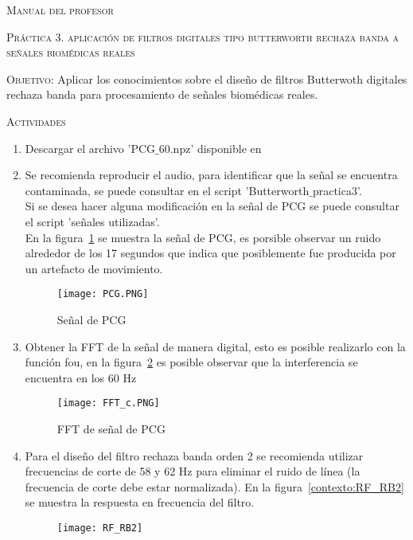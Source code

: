 \documentclass[10pt,letterpaper,spanish,twoside]{report}
\begin{document}
\docdate

\begin{center}
 \textsc{\asignatura}\vspace{.2em}
\end{center}

\textsc{Manual del profesor}\vspace{.2em}

\textsc{Práctica 3. aplicación de filtros digitales tipo butterworth rechaza banda a señales biomédicas reales}

\textsc{Objetivo:} Aplicar los conocimientos sobre el diseño de filtros Butterwoth digitales rechaza banda para procesamiento de señales biomédicas reales.

\textsc{Actividades}
\begin{enumerate}
 \item Descargar el archivo 'PCG$\_$60.npz' disponible en 
 \item Se recomienda reproducir el audio, para identificar que la señal se encuentra contaminada, se puede consultar en el script 'Butterworth$\_$practica3'. 
 \\ Si se desea hacer alguna modificación en la señal de PCG se puede consultar el script 'señales utilizadas'.
 \\En la figura~\ref{contexto:PCG} se muestra la señal de PCG, es porsible observar un ruido alrededor de los 17 segundos que indica que posiblemente fue producida por un artefacto de movimiento.
 \begin{figure}[H]
 	\centering
 	\texttt{[image: PCG.PNG]}
 	\caption{Señal de PCG}
	\label{contexto:PCG}
 \end{figure}
 \item Obtener la FFT de la señal de manera digital, esto es posible realizarlo con la función fou, en la figura~\ref{contexto:FFT_c} es posible observar que la interferencia se encuentra en los 60 Hz 
 \begin{figure}[H]
 	\centering
 	\texttt{[image: FFT\_c.PNG]}
 	\caption{FFT de señal de PCG}
 	\label{contexto:FFT_c}
 \end{figure}
 \item Para el diseño del filtro rechaza banda orden 2 se recomienda utilizar frecuencias de corte de 58 y 62 Hz para eliminar el ruido de línea (la frecuencia de corte debe estar normalizada). En la figura~\ref{contexto:RF_RB2} se muestra la respuesta en frecuencia del filtro.
 \begin{figure}[H]
 	\centering
 	\texttt{[image: RF\_RB2]}

\end{figure}
\end{enumerate}
\end{document}
